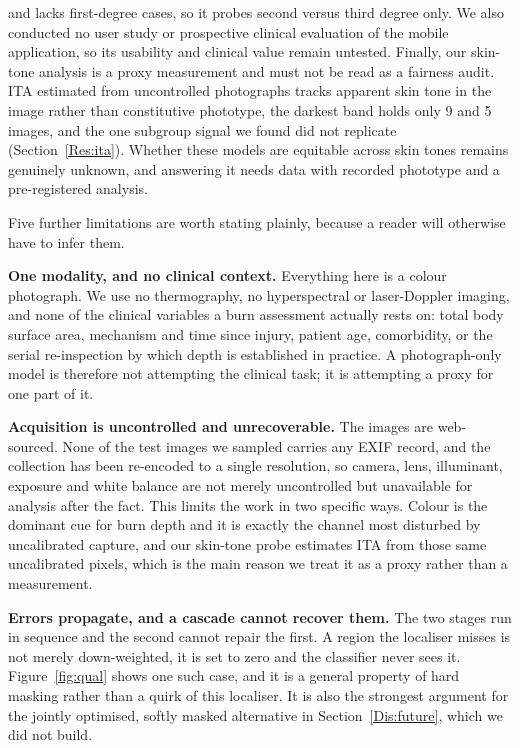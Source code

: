 \documentclass{melba}
\begin{document}
and lacks first-degree cases, so it probes second versus third degree only. We also conducted no user study or prospective clinical evaluation of the mobile application, so its usability and clinical value remain untested. Finally, our skin-tone analysis is a proxy measurement and must not be read as a fairness audit. ITA estimated from uncontrolled photographs tracks apparent skin tone in the image rather than constitutive phototype, the darkest band holds only 9 and 5 images, and the one subgroup signal we found did not replicate (Section~\ref{Res:ita}). Whether these models are equitable across skin tones remains genuinely unknown, and answering it needs data with recorded phototype and a pre-registered analysis.

Five further limitations are worth stating plainly, because a reader will otherwise have to infer them.

\textbf{One modality, and no clinical context.} Everything here is a colour photograph. We use no thermography, no hyperspectral or laser-Doppler imaging, and none of the clinical variables a burn assessment actually rests on: total body surface area, mechanism and time since injury, patient age, comorbidity, or the serial re-inspection by which depth is established in practice. A photograph-only model is therefore not attempting the clinical task; it is attempting a proxy for one part of it.

\textbf{Acquisition is uncontrolled and unrecoverable.} The images are web-sourced. None of the test images we sampled carries any EXIF record, and the collection has been re-encoded to a single resolution, so camera, lens, illuminant, exposure and white balance are not merely uncontrolled but unavailable for analysis after the fact. This limits the work in two specific ways. Colour is the dominant cue for burn depth and it is exactly the channel most disturbed by uncalibrated capture, and our skin-tone probe estimates ITA from those same uncalibrated pixels, which is the main reason we treat it as a proxy rather than a measurement.

\textbf{Errors propagate, and a cascade cannot recover them.} The two stages run in sequence and the second cannot repair the first. A region the localiser misses is not merely down-weighted, it is set to zero and the classifier never sees it. Figure~\ref{fig:qual} shows one such case, and it is a general property of hard masking rather than a quirk of this localiser. It is also the strongest argument for the jointly optimised, softly masked alternative in Section~\ref{Dis:future}, which we did not build.
\end{document}
